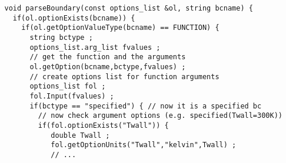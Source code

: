 \begin{verbatim}
   void parseBoundary(const options_list &ol, string bcname) {
     if(ol.optionExists(bcname)) {
       if(ol.getOptionValueType(bcname) == FUNCTION) {
         string bctype ;
         options_list.arg_list fvalues ;
         // get the function and the arguments
         ol.getOption(bcname,bctype,fvalues) ;
         // create options list for function arguments
         options_list fol ;
         fol.Input(fvalues) ;
         if(bctype == "specified") { // now it is a specified bc
           // now check argument options (e.g. specified(Twall=300K))
           if(fol.optionExists("Twall")) {
              double Twall ;
              fol.getOptionUnits("Twall","kelvin",Twall) ;
              // ...
\end{verbatim}

